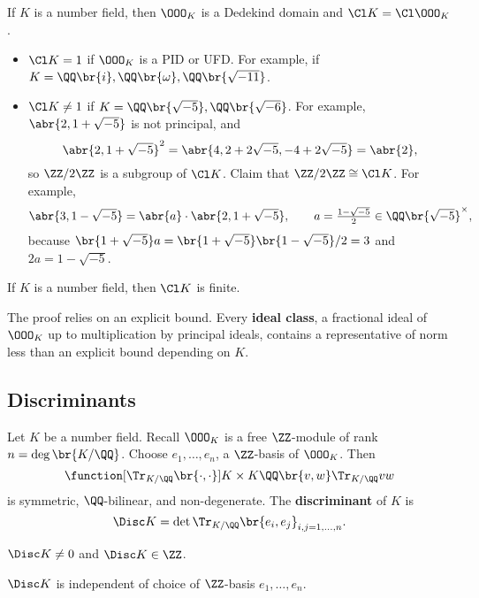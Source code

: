 If $ K $ is a number field, then $ \OOO_K $ is a Dedekind domain and $ \Cl K = \Cl \OOO_K $.

\begin{example*}
\hfill
\begin{itemize}
\item $ \Cl K = 1 $ if $ \OOO_K $ is a PID or UFD. For example, if $ K = \QQ\br{i}, \QQ\br{\omega}, \QQ\br{\sqrt{-11}} $.
\item $ \Cl K \ne 1 $ if $ K = \QQ\br{\sqrt{-5}}, \QQ\br{\sqrt{-6}} $. For example, $ \abr{2, 1 + \sqrt{-5}} $ is not principal, and
$$ \abr{2, 1 + \sqrt{-5}}^2 = \abr{4, 2 + 2\sqrt{-5}, -4 + 2\sqrt{-5}} = \abr{2}, $$
so $ \ZZ / 2\ZZ $ is a subgroup of $ \Cl K $. Claim that $ \ZZ / 2\ZZ \cong \Cl K $. For example,
$$ \abr{3, 1 - \sqrt{-5}} = \abr{a} \cdot \abr{2, 1 + \sqrt{-5}}, \qquad a = \tfrac{1 - \sqrt{-5}}{2} \in \QQ\br{\sqrt{-5}}^\times, $$
because $ \br{1 + \sqrt{-5}}a = \br{1 + \sqrt{-5}}\br{1 - \sqrt{-5}} / 2 = 3 $ and $ 2a = 1 - \sqrt{-5} $.
\end{itemize}
\end{example*}

\begin{theorem}
If $ K $ is a number field, then $ \Cl K $ is finite.
\end{theorem}

The proof relies on an explicit bound. Every \textbf{ideal class}, a fractional ideal of $ \OOO_K $ up to multiplication by principal ideals, contains a representative of norm less than an explicit bound depending on $ K $.

\subsection{Discriminants}

Let $ K $ be a number field. Recall $ \OOO_K $ is a free $ \ZZ $-module of rank $ n = \deg \br{K / \QQ} $. Choose $ e_1, \dots, e_n $, a $ \ZZ $-basis of $ \OOO_K $. Then
$$ \function[\Tr_{K / \QQ}\br{\cdot, \cdot}]{K \times K}{\QQ}{\br{v, w}}{\Tr_{K / \QQ} vw} $$
is symmetric, $ \QQ $-bilinear, and non-degenerate. The \textbf{discriminant} of $ K $ is
$$ \Disc K = \det \Tr_{K / \QQ}\br{e_i, e_j}_{i, j = 1, \dots, n}. $$

\begin{remark*}
$ \Disc K \ne 0 $ and $ \Disc K \in \ZZ $.
\end{remark*}

\pagebreak

\begin{lemma}
$ \Disc K $ is independent of choice of $ \ZZ $-basis $ e_1, \dots, e_n $.
\end{lemma}


